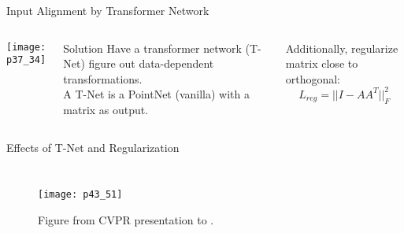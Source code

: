 \begin{frame}[c]{Input Alignment by Transformer Network}
    \begin{columns}
        \texttt{[image: p37\_34]}
        \large
        \pause
        \begin{greenblock}{Solution}
            Have a transformer network (T-Net) figure out data-dependent
            transformations. \\
            \vspace{1em}
            A T-Net is a PointNet (vanilla) with a matrix as output.
        \end{greenblock}
        \vspace{1em}

        \pause
        Additionally, regularize matrix close to orthogonal: $$ L_{reg} = || I - AA^T||_F^2 $$

    \end{columns}
\end{frame}


\begin{frame}[c]{Effects of T-Net and Regularization}
    \begin{columns}
        \begin{figure}
            \texttt{[image: p43\_51]}
            \caption{Figure from CVPR presentation to \cite{qi2017pointnet}.}
        \end{figure}
        \Large
        \pause
        
    \end{columns}
\end{frame}

